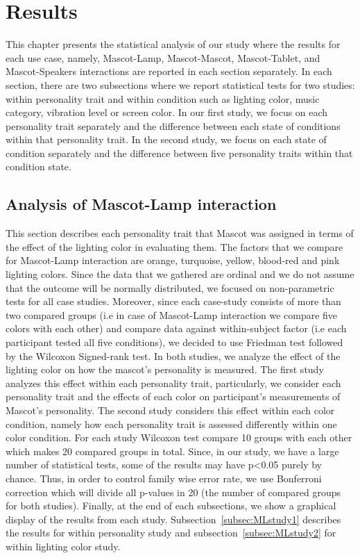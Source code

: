 \chapter{Results}
\label{ch:results}
This chapter presents the statistical analysis of our study where the results
for each use case, namely, Mascot-Lamp, Mascot-Mascot, Mascot-Tablet, and
Mascot-Speakers interactions are reported in each section separately.
In each section, there are two subsections where we report statistical tests for two
studies: within personality trait and within condition such as lighting color, music
category, vibration level or screen color.
In our first study, we focus on each personality trait separately
and the difference between each state of conditions within that personality trait.
In the second study, we focus on each state of condition separately
and the difference between five personality traits within that condition state.

\section{Analysis of Mascot-Lamp interaction}
\label{sec:m-l}
This section describes each personality trait that Mascot was assigned in terms of
the effect of the lighting color in evaluating them.
The factors that we compare for Mascot-Lamp interaction are orange, turquoise,
yellow, blood-red and pink lighting colors.
Since the data that we gathered are ordinal and we do not assume that the outcome
will be normally distributed, we focused on non-parametric tests for all case studies.
Moreover, since each case-study consists of more than two compared groups
(i.e in case of Mascot-Lamp interaction we compare five colors with each other)
and compare data against within-subject factor (i.e each participant tested all five conditions),
we decided to use Friedman test followed by the Wilcoxon Signed-rank test.
In both studies, we analyze the effect of the lighting color on how the mascot’s personality is measured.
The first study analyzes this effect within each personality trait, particularly, we consider each
personality trait and the effects of each color on participant's measurements of Mascot's personality.
The second study considers this effect within each color condition,
namely how each personality trait is assessed differently within one color condition.
For each study Wilcoxon test compare 10 groups with each other which makes 20 compared groups in total.
Since, in our study, we have a large number of statistical tests, some of the results may have p<0.05 purely by chance.
Thus, in order to control family wise error rate, we use Bonferroni correction which will
divide all p-values in 20 (the number of compared groups for both studies).
Finally, at the end of each subsections, we show a graphical display of the results from each study.
Subsection~\ref{subsec:MLstudy1} describes the results for within personality study and
subsection~\ref{subsec:MLstudy2} for within lighting color study.

